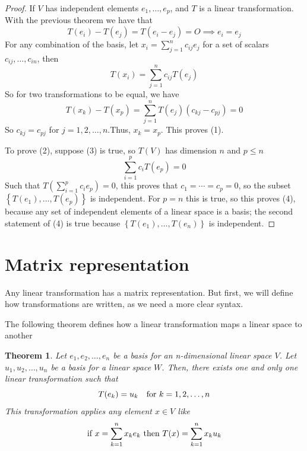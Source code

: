 \documentclass{book}
\newtheorem{theorem}{Theorem}[section]
\begin{document}
\begin{proof}
    If $V$ has independent elements $e_1,\dots,e_p$, and $T$ is a linear transformation.
    With the previous theorem we have that
    \begin{equation}
        T(e_i) - T(e_j) = T(e_i - e_j) = O \implies e_i = e_j
    \end{equation}
    For any combination of the basis, let $x_i =\sum_{j=1}^{n}{c_{ij} e_j}$ for a
    set of scalars $c_{ij},\dots,c_{in}$, then
    \begin{equation}
        T(x_i) = \sum_{j=1}^{n}{c_{ij} T(e_j)}
    \end{equation}
    So for two transformations to be equal, we have
    \begin{equation}
        T(x_k) - T(x_p) = \sum_{j=1}^{n}{T(e_j)(c_{kj} - c_{pj})} = 0
    \end{equation}
    So $c_{kj} = c_{pj}$ for $j=1,2,\dots,n$.Thus, $x_k=x_p$. This proves (1).

    To prove (2), suppose (3) is true, so $T(V)$ has dimension $n$ and $p\leq n$
    \begin{equation}
        \sum_{i=1}^{p}c_i{T(e_p)}=0
    \end{equation}
    Such that $T\left(\sum_{i=1}^{p}c_i{e_p}\right)=0$, this proves that $c_1 = \cdots = c_p = 0$, so
    the subset $\left\{T(e_1),\dots,T(e_p)\right\}$ is independent. For $p=n$ this is true, so this proves
    (4), because any set of independent elements of a linear space is a basis; the second
    statement of (4) is true because $\left\{T(e_1),\dots,T(e_n)\right\}$ is independent.
\end{proof}

\section{Matrix representation}

Any linear transformation has a matrix representation. But first, we will
define how transformations are written, as we need a more clear syntax.

The following theorem defines how a linear transformation maps a linear space
to another

\begin{theorem}
    Let $e_1,e_2,\dots,e_n$ be a basis for an n-dimensional linear space $V$. Let $u_1,u_2,\dots,u_n$ be a basis
    for a linear space $W$. Then, there exists one and only one linear transformation such that
    \begin{equation}
        T(e_k) = u_k \quad \textnormal{for } k=1,2,\dots,n
    \end{equation}
    This transformation applies any element $x\in V$ like
    \begin{equation}
        \textnormal{if }x=\sum_{k=1}^{n}{x_k e_k}\textnormal{ then } T(x)=\sum_{k=1}^{n}{x_k u_k}
    \end{equation}
\end{theorem}
\end{document}
